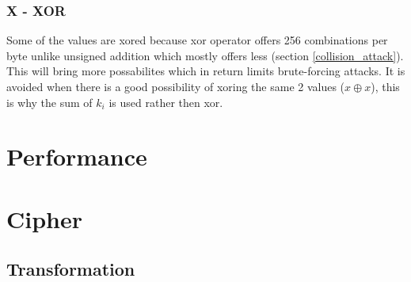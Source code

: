 \documentclass[fleqn, a4paper,12pt]{article}
\begin{document}
\subsubsection{X - XOR} %

Some of the values are xored because xor operator offers 256 combinations per byte unlike unsigned addition which mostly offers less (section \ref{collision_attack}). This will bring more possabilites which in return limits brute-forcing attacks. It is avoided when there is a good possibility of xoring the same 2 values ($x \oplus x$), this is why the sum of $k_i$ is used rather then xor.

\section{Performance}


\section {Cipher}

\subsection{Transformation}
\end{document}
